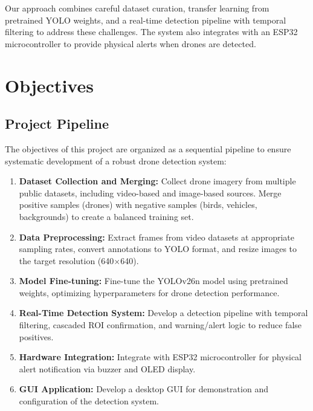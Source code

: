 \documentclass[a4paper,12pt]{report}
\begin{document}
Our approach combines careful dataset curation, transfer learning from pretrained YOLO weights, and a real-time detection pipeline with temporal filtering to address these challenges. The system also integrates with an ESP32 microcontroller to provide physical alerts when drones are detected.

\newpage

\chapter{Objectives}

\section{Project Pipeline}

The objectives of this project are organized as a sequential pipeline to ensure systematic development of a robust drone detection system:

\begin{enumerate}
    \item \textbf{Dataset Collection and Merging:} Collect drone imagery from multiple public datasets, including video-based and image-based sources. Merge positive samples (drones) with negative samples (birds, vehicles, backgrounds) to create a balanced training set.
    
    \item \textbf{Data Preprocessing:} Extract frames from video datasets at appropriate sampling rates, convert annotations to YOLO format, and resize images to the target resolution (640$\times$640).
    
    \item \textbf{Model Fine-tuning:} Fine-tune the YOLOv26n model using pretrained weights, optimizing hyperparameters for drone detection performance.
    
    \item \textbf{Real-Time Detection System:} Develop a detection pipeline with temporal filtering, cascaded ROI confirmation, and warning/alert logic to reduce false positives.
    
    \item \textbf{Hardware Integration:} Integrate with ESP32 microcontroller for physical alert notification via buzzer and OLED display.
    
    \item \textbf{GUI Application:} Develop a desktop GUI for demonstration and configuration of the detection system.
\end{enumerate}
\end{document}
